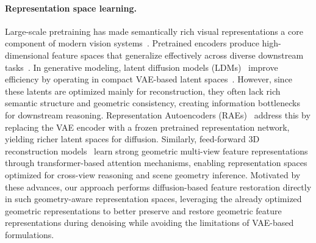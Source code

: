 

\paragraph{Representation space learning.}
Large-scale pretraining has made semantically rich visual representations a core component of modern vision systems~\cite{oquab2023dinov2, he2022masked, radford2021learning, tschannen2025siglip, lee2023domain}. Pretrained encoders produce high-dimensional feature spaces that generalize effectively across diverse downstream tasks~\cite{zheng2025diffusion, jang2026gld, tong2026scaling, kumar2026learning}. In generative modeling, latent diffusion models (LDMs)~\cite{rombach2022high, esser2024scaling, peebles2023scalable, kilian2024computational, kim2025unifieddiffusiontransformerhighfidelity, min2025text} improve efficiency by operating in compact VAE-based latent spaces~\cite{kingma2013auto}. However, since these latents are optimized mainly for reconstruction, they often lack rich semantic structure and geometric consistency, creating information bottlenecks for downstream reasoning. Representation Autoencoders (RAEs)~\cite{zheng2025diffusion, tong2026scaling, kumar2026learning} address this by replacing the VAE encoder with a frozen pretrained representation network, yielding richer latent spaces for diffusion. Similarly, feed-forward 3D reconstruction models~\cite{depthanything3, wang2025vggt, leroy2024grounding, wang2024dust3r, wang2025pi} learn strong geometric multi-view feature representations through transformer-based attention mechanisms, enabling representation spaces optimized for cross-view reasoning and scene geometry inference. Motivated by these advances, our approach performs diffusion-based feature restoration directly in such geometry-aware representation spaces, leveraging the already optimized geometric representations to better preserve and restore geometric feature representations during denoising while avoiding the limitations of VAE-based formulations.



